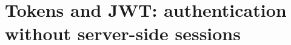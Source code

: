 \chapter{Tokens and JWT: authentication without server-side sessions}
\label{ch:tokens-and-jwt-authentication-without}

